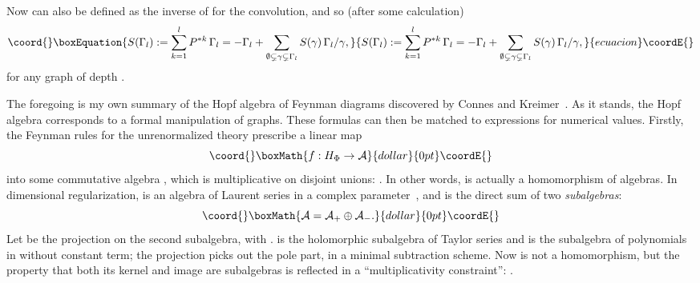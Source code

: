 \documentclass[a4paper,12pt]{article}
\providecommand{\A}{\mathcal{A}}        %
\providecommand{\eps}{\varepsilon}      %
\providecommand{\Ga}{\Gamma}            %
\providecommand{\ga}{\gamma}            %
\DeclareMathOperator{\id}{id}       %
\providecommand{\1}{\mathbf{1}}         %
\providecommand{\7}{\dagger}            %
\providecommand{\8}{\bullet}            %
\renewcommand{\.}{\cdot}            %
\renewcommand{\:}{\colon}           %
\begin{document}
Now \coordHE{} can also be defined as the inverse of \myHighlight{$\id = u\circ\eps - P$}\coordHE{}
for the convolution, and so (after some calculation)
\begin{equation}\coord{}\boxEquation{
S(\Ga_l) := \sum_{k=1}^l P^{*k}\,\Ga_l =
-\Ga_l + \sum_{\emptyset\subsetneq\ga\subsetneq\Ga_l}S(\ga)\,\Ga_l/\ga,
\label{eq:graph-antp}
}{
S(\Ga_l) := \sum_{k=1}^l P^{*k}\,\Ga_l =
-\Ga_l + \sum_{\emptyset\subsetneq\ga\subsetneq\Ga_l}S(\ga)\,\Ga_l/\ga,
}{ecuacion}\coordE{}\end{equation}
for any graph \myHighlight{$\Ga_l$}\coordHE{} of depth \coordHE{}.

The foregoing is my own summary of the Hopf algebra of Feynman
diagrams discovered by Connes and
Kreimer~\cite{ConnesKrRHI,ConnesKrRHII}. As it stands, the Hopf
algebra \coordHE{} corresponds to a formal manipulation of graphs. These
formulas can then be matched to expressions for numerical values.
Firstly, the Feynman rules for the unrenormalized theory prescribe a
linear map
$$\coord{}\boxMath{
f : H_\Phi \to \A
}{dollar}{0pt}\coordE{}$$
into some commutative algebra \myHighlight{$\A$}\coordHE{}, which is multiplicative on
disjoint unions: \myHighlight{$f(\Ga_1 \Ga_2) = f(\Ga_1)\,f(\Ga_2)$}\coordHE{}. In other
words, \coordHE{} is actually a homomorphism of algebras. In dimensional
regularization, \myHighlight{$\A$}\coordHE{} is an algebra of Laurent series in a complex
parameter~\myHighlight{$\eps$}\coordHE{}, and \myHighlight{$\A$}\coordHE{} is the direct sum of two
\textit{subalgebras}:
$$\coord{}\boxMath{
\A = \A_+ \oplus \A_-.
}{dollar}{0pt}\coordE{}$$
Let \myHighlight{$T\: \A \to \A_-$}\coordHE{} be the projection on the second subalgebra, with
\myHighlight{$\ker T = \A_+$}\coordHE{}. \myHighlight{$\A_+$}\coordHE{} is the holomorphic subalgebra of Taylor series
and \myHighlight{$\A_-$}\coordHE{} is the subalgebra of polynomials in \myHighlight{$1/\eps$}\coordHE{} without
constant term; the projection \coordHE{} picks out the pole part, in a
minimal subtraction scheme. Now \coordHE{} is not a homomorphism, but the
property that both its kernel and image are subalgebras is reflected
in a ``multiplicativity constraint'':
\coordHE{}.
\end{document}
